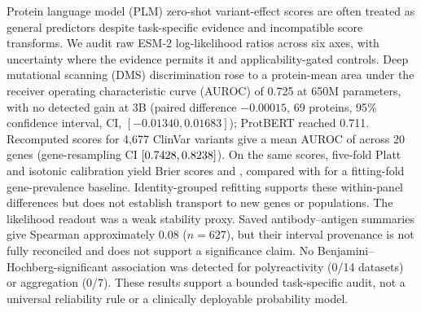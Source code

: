 \noindent Protein language model (PLM) zero-shot variant-effect scores are often treated as general predictors despite task-specific evidence and incompatible score transforms. We audit raw ESM-2 log-likelihood ratios across six axes, with uncertainty where the evidence permits it and applicability-gated controls. Deep mutational scanning (DMS) discrimination rose to a protein-mean area under the receiver operating characteristic curve (AUROC) of 0.725 at 650M parameters, with no detected gain at 3B (paired difference $-0.00015$, 69 proteins, 95\% confidence interval, CI, $[-0.01340,0.01683]$); ProtBERT reached 0.711. Recomputed scores for 4,677 ClinVar variants give a mean AUROC of \ClinicalMacroAUC{} across 20 genes (gene-resampling CI $[0.7428,0.8238]$). On the same scores, five-fold Platt and isotonic calibration yield Brier scores \PlattBrier{} and \IsoBrier{}, compared with \GenePrevBrier{} for a fitting-fold gene-prevalence baseline. Identity-grouped refitting supports these within-panel differences but does not establish transport to new genes or populations. The likelihood readout was a weak stability proxy. Saved antibody--antigen summaries give Spearman approximately 0.08 ($n=627$), but their interval provenance is not fully reconciled and does not support a significance claim. No Benjamini--Hochberg-significant association was detected for polyreactivity (0/14 datasets) or aggregation (0/7). These results support a bounded task-specific audit, not a universal reliability rule or a clinically deployable probability model.
